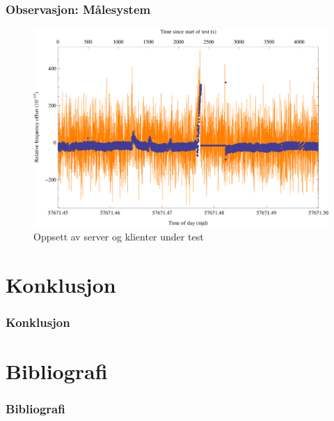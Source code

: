 \documentclass[xcolor=table]{beamer}
\begin{document}
\begin{frame}
\frametitle{Observasjon: Målesystem}
      \begin{figure}
        \includegraphics[scale=0.70]{thesis/graphics/cns91-and-csac-telemetry-frequency-1.png}
        \caption{Oppsett av server og klienter under test}
      \end{figure}
\end{frame}

\section{Konklusjon}
\begin{frame}
  \frametitle{Konklusjon}
\end{frame}

\section{Bibliografi}
\begin{frame}[allowframebreaks]%
  \frametitle{Bibliografi}
  \printbibliography[heading=bibintoc]
\end{frame}
\end{document}
